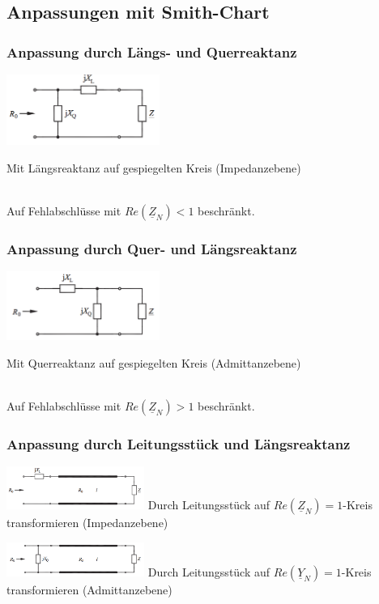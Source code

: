 	
	\subsection{Anpassungen mit Smith-Chart}
	\begin{multicols}{2}
		\subsubsection{Anpassung durch Längs- und Querreaktanz}
			\parbox[c]{5cm}{\includegraphics[width = 5cm]{./bilder/Anp_Laengs_Querreaktanz}} \parbox[c]{4cm}{Mit Längsreaktanz auf gespiegelten Kreis (Impedanzebene)}\\
			Auf Fehlabschlüsse mit $Re(\underline{Z}_N)<1$ beschränkt.
		\subsubsection{Anpassung durch Quer- und Längsreaktanz}
			\parbox[c]{5cm}{\includegraphics[width = 5cm]{./bilder/Anp_Quer_Laengsreaktanz}}
			\parbox[c]{4cm}{Mit Querreaktanz auf gespiegelten Kreis (Admittanzebene)}\\
			Auf Fehlabschlüsse mit $Re(\underline{Z}_N)>1$ beschränkt.
			\columnbreak
		\subsubsection{Anpassung durch Leitungsstück und Längsreaktanz}
			\parbox[c]{4.5cm}{\includegraphics[width = 4.5cm]{./bilder/Anp_Leitung_Laengsreaktanz}
			Durch Leitungsstück auf $Re(\underline{Z}_N)=1$-Kreis transformieren (Impedanzebene)} \hspace{0.5cm}
			\parbox[c]{4.5cm}{\includegraphics[width = 4.5cm]{./bilder/Anp_Leitung_Querreaktanz}
			Durch Leitungsstück auf $Re(\underline{Y}_N)=1$-Kreis transformieren (Admittanzebene)}

\end{multicols}
